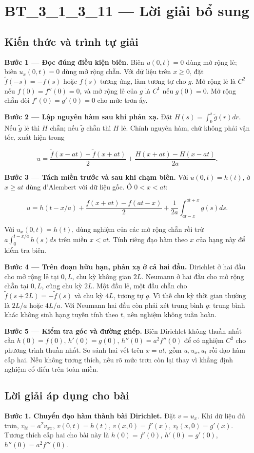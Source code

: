 \documentclass[10pt,a4paper]{article}
\begin{document}
\section*{BT\_3\_1\_3\_11 — Lời giải bổ sung}
\subsection*{Kiến thức và trình tự giải}
\textbf{Bước 1 — Đọc đúng điều kiện biên.} Biên $u(0,t)=0$ dùng mở rộng lẻ; biên $u_x(0,t)=0$ dùng mở rộng chẵn. Với dữ liệu trên $x\ge0$, đặt $\widetilde f(-s)=-f(s)$ hoặc $f(s)$ tương ứng, làm tương tự cho $g$. Mở rộng lẻ là $C^2$ nếu $f(0)=f''(0)=0$, và mở rộng lẻ của $g$ là $C^1$ nếu $g(0)=0$. Mở rộng chẵn đòi $f'(0)=g'(0)=0$ cho mức trơn ấy.

\textbf{Bước 2 — Lập nguyên hàm sau khi phản xạ.} Đặt $H(s)=\int_0^s\widetilde g(r)dr$. Nếu $\widetilde g$ lẻ thì $H$ chẵn; nếu $\widetilde g$ chẵn thì $H$ lẻ. Chính nguyên hàm, chứ không phải vận tốc, xuất hiện trong


\[
u=\frac{\widetilde f(x-at)+\widetilde f(x+at)}2+\frac{H(x+at)-H(x-at)}{2a}.
\]


\textbf{Bước 3 — Tách miền trước và sau khi chạm biên.} Với $u(0,t)=h(t)$, ở $x\ge at$ dùng d'Alembert với dữ liệu gốc. Ở $0<x<at$:


\[
u=h(t-x/a)+\frac{f(x+at)-f(at-x)}2+\frac1{2a}\int_{at-x}^{at+x}g(s)ds.
\]


Với $u_x(0,t)=h(t)$, dùng nghiệm của các mở rộng chẵn rồi trừ $a\int_0^{t-x/a}h(s)ds$ trên miền $x<at$. Tính riêng đạo hàm theo $x$ của hạng này để kiểm tra biên.

\textbf{Bước 4 — Trên đoạn hữu hạn, phản xạ ở cả hai đầu.} Dirichlet ở hai đầu cho mở rộng lẻ tại $0,L$, chu kỳ không gian $2L$. Neumann ở hai đầu cho mở rộng chẵn tại $0,L$, cũng chu kỳ $2L$. Một đầu lẻ, một đầu chẵn cho $\widetilde f(s+2L)=-\widetilde f(s)$ và chu kỳ $4L$, tương tự $g$. Vì thế chu kỳ thời gian thường là $2L/a$ hoặc $4L/a$. Với Neumann hai đầu còn phải xét trung bình $g$: trung bình khác không sinh hạng tuyến tính theo $t$, nên nghiệm không tuần hoàn.

\textbf{Bước 5 — Kiểm tra góc và đường ghép.} Biên Dirichlet không thuần nhất cần $h(0)=f(0)$, $h'(0)=g(0)$, $h''(0)=a^2f''(0)$ để có nghiệm $C^2$ cho phương trình thuần nhất. So sánh hai vết trên $x=at$, gồm $u,u_x,u_t$ rồi đạo hàm cấp hai. Nếu không tương thích, nêu rõ mức trơn còn lại thay vì khẳng định nghiệm cổ điển trên toàn miền.
\subsection*{Lời giải áp dụng cho bài}
\textbf{Bước 1. Chuyển đạo hàm thành bài Dirichlet.} Đặt $v=u_x$. Khi dữ liệu đủ trơn, $v_{tt}=a^2v_{xx}$, $v(0,t)=h(t)$, $v(x,0)=f'(x)$, $v_t(x,0)=g'(x)$. Tương thích cấp hai cho bài này là $h(0)=f'(0)$, $h'(0)=g'(0)$, $h''(0)=a^2f'''(0)$.
\end{document}
